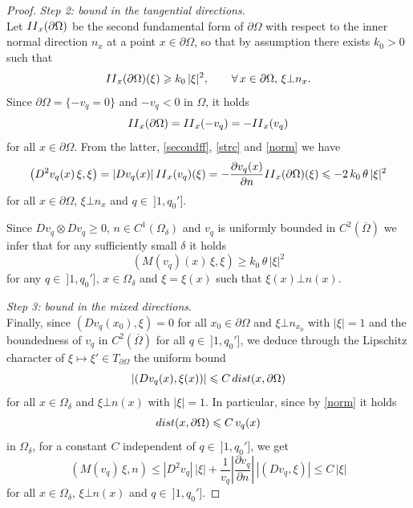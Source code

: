 \documentclass[10pt,a4paper]{amsart}
\newcommand{\beq}{\begin{equation}}
\newcommand{\eeq}{\end{equation}}
\renewcommand{\ge}{\geqslant}
\renewcommand{\le}{\leqslant}
\begin{document}
\begin{proof}
\smallskip
 {\em Step 2: bound in the tangential directions}.\ \\
 Let ${\rm II}_{x}(\partial\Omega)$ be the second fundamental form of $\partial\Omega$ with respect to the inner normal direction $ n_x$ at a point $x\in \partial\Omega$, so that by assumption there exists $k_0>0$ such that 
\beq
\label{strc}
{\rm II}_{x}(\partial\Omega)(\xi)\ge k_0\, |\xi|^2, \qquad \forall \, x\in \partial\Omega, \, \xi\bot n_x.
\eeq
Since $\partial\Omega=\{-v_q=0\}$ and $-v_q<0$ in $\Omega$, it holds
\[
{\rm II}_{x}(\partial\Omega)={\rm II}_{x}(-v_q)=-{\rm II}_{x}(v_q)
\]
for all $x\in \partial\Omega$.
From the latter, \eqref{secondff}, \eqref{strc} and \eqref{norm} we have
\[
\left(D^2v_q(x)\, \xi, \xi\right)=|Dv_q(x)|\, {\rm II}_x(v_q)(\xi)=- \frac{\partial v_q(x)}{\partial n}{\rm II}_{x}(\partial\Omega)(\xi) \le -2\, k_0\, \theta\, |\xi|^2
\]
for all $x\in \partial\Omega$, $\xi\bot n_x$ and $q\in \ ]1, q_0']$.

 Since $Dv_q\otimes Dv_q\ge 0$, $n\in C^1(\Omega_\delta)$ and $v_q$ is uniformly bounded in $C^2(\overline{\Omega})$ we infer that for any sufficiently small $\delta$ it holds
 \beq
 \label{tang}
 \left(M(v_q)(x)\, \xi, \xi\right)\ge k_0\, \theta\, |\xi|^2
 \eeq
 for any $q\in \ ]1, q_0']$, $x\in \Omega_\delta$ and $\xi=\xi(x)$ such that $\xi(x)\bot n(x)$. 
 
 \smallskip
 {\em Step 3: bound in the mixed directions}.\ \\
 Finally, since $(Dv_q(x_0), \xi)=0$ for all $x_0\in \partial\Omega$ and $\xi\bot n_{x_0}$ with $|\xi|=1$ and the boundedness of $v_q$ in $C^2(\overline{\Omega})$ for all $q\in \ ]1, q_0']$, we deduce through the Lipschitz character of $\xi\mapsto \xi'\in T_{\partial \Omega}$ the uniform bound
 \[
|(Dv_q(x), \xi(x))|\le C\, {\rm dist}(x, \partial\Omega)
 \]
for all $x\in \Omega_\delta$ and $\xi\bot n(x)$ with $|\xi|=1$. In particular, since by \eqref{norm} it holds
\[
{\rm dist}(x, \partial\Omega)\le C\, v_q(x)
\]
in $\Omega_\delta$, for a constant $C$ independent of $q\in \ ]1, q_0']$, we get 
\begin{equation}\label{eq_mixed_dir}
\left(M(v_q)\, \xi, n\right)\le |D^2 v_q|\, |\xi|+ \frac{1}{v_q} \left|\frac{\partial v_q}{\partial n}\right|\, \left|(Dv_q, \xi)\right|\le C\, |\xi|
\end{equation}
for all $x\in \Omega_\delta$, $\xi\bot n(x)$ and $q\in \ ]1, q_0']$.


\end{proof}
\end{document}

